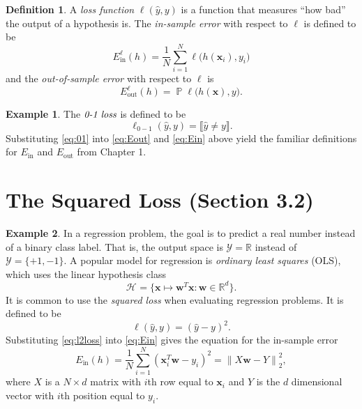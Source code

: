 \documentclass[10pt]{exam}
\theoremstyle{definition}
\newtheorem{example}{Example}
\newtheorem{defn}{Definition}
\newcommand{\R}{\mathbb R}
\DeclareMathOperator{\prob}{\mathbb P}
\newcommand{\Ein}{E_{\text{in}}}
\newcommand{\Eout}{E_{\text{out}}}
\newcommand{\trans}[1]{{#1}^{T}}
\newcommand{\w}{\mathbf w}
\newcommand{\x}{\mathbf x}
\newcommand{\ltwo}[1]{{\lVert {#1} \rVert}_2}
\newcommand{\HH}[1]{\mathcal H_{\text{#1}}}
\begin{document}
\begin{defn}
    A \emph{loss function} $\ell(\hat y, y)$ is a function that measures ``how bad'' the output of a hypothesis is.
    The \emph{in-sample error} with respect to $\ell$ is defined to be
    \begin{equation}
        \label{eq:Ein}
        \Ein^{\ell}(h) = \frac{1}{N} \sum_{i=1}^N \ell\big(h(\x_i), y_i\big)
    \end{equation}
    and the \emph{out-of-sample error} with respect to $\ell$ is
    \begin{equation}
        \label{eq:Eout}
        \Eout^{\ell}(h) = \prob \ell\big(h(\x), y\big)
        .
    \end{equation}
\end{defn}

\begin{example}
    The $\emph{0-1 loss}$ is defined to be
    \begin{equation}
        \label{eq:01}
        \ell_{0-1}(\hat y, y) = \llbracket \hat y \ne y \rrbracket
        .
    \end{equation}
    Substituting \eqref{eq:01} into \eqref{eq:Eout} and \eqref{eq:Ein} above yield the familiar definitions for $\Ein$ and $\Eout$ from Chapter 1.
\end{example}

\section*{The Squared Loss (Section 3.2)}

\begin{example}
    In a regression problem, the goal is to predict a real number instead of a binary class label.
    That is, the output space is $\mathcal Y=\R$ instead of $\mathcal Y = \{+1, -1\}$.
    A popular model for regression is \emph{ordinary least squares} (OLS), which uses the linear hypothesis class
    \begin{equation}
        \HH{} = \bigg\{ \x \mapsto \trans\w \x : \w \in \R^d \bigg\}.
    \end{equation}
    It is common to use the \emph{squared loss} when evaluating regression problems.
    It is defined to be
    \begin{equation}
        \label{eq:l2loss}
        \ell(\hat y, y) = (\hat y - y)^2
        .
    \end{equation}
    Substituting \eqref{eq:l2loss} into \eqref{eq:Ein} gives the equation for the in-sample error
    \begin{equation}
        \Ein(h) 
        = \frac{1}{N}\sum_{i=1}^N (\trans\x_i \w - y_i)^2
        = \ltwo{X\w - Y}^2,
    \end{equation}
    where $X$ is a $N \times d$ matrix with $i$th row equal to $\x_i$ and $Y$ is the $d$ dimensional vector with $i$th position equal to $y_i$.
\end{example}
\end{document}
